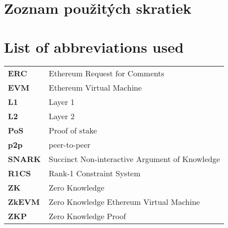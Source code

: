 \thispagestyle{plain}

\ifx\FIITlagEN\undefined
    \section*{\Huge Zoznam použitých skratiek}
\else
    \section*{\Huge List of abbreviations used}
\fi
\vskip 1cm

\begin{tabular}{ >{\bfseries}m{2cm} m{10cm} }
	ERC & Ethereum Request for Comments 					\\
	EVM & Ethereum Virtual Machine 							\\
	L1 	& Layer 1 											\\
	L2 	& Layer 2 											\\
	PoS & Proof of stake 									\\
	p2p & peer-to-peer 										\\
	SNARK & Succinct Non-interactive Argument of Knowledge 	\\
	R1CS & Rank-1 Constraint System 						\\
	ZK  & Zero Knowledge           							\\
	ZkEVM  & Zero Knowledge Ethereum Virtual Machine   		\\
	ZKP & Zero Knowledge Proof
\end{tabular}

\emptypage
